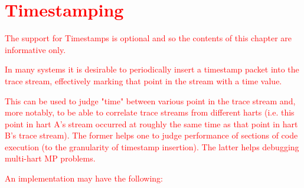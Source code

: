 \chapter{\textcolor{red}{Timestamping}} \label{ch:timestamping}

\textcolor{red}{The support for Timestamps is optional and so the
  contents of this chapter are informative only.}


\textcolor{red}{In many systems it is desirable to periodically insert a
timestamp packet into the trace stream, effectively marking that point
in the stream with a time value.}

\textcolor{red}{This can be used to judge "time" between various point in the trace
stream and, more notably, to be able to correlate trace streams from
different harts (i.e. this point in hart A's stream occurred at
roughly the same time as that point in hart B's trace stream).  The
former helps one to judge performance of sections of code execution
(to the granularity of timestamp insertion). The latter helps
debugging multi-hart MP problems.}

\textcolor{red}{An implementation may have the following: }

